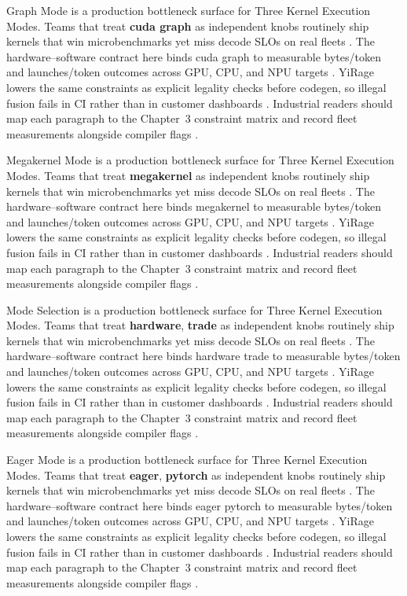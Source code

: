 Graph Mode is a production bottleneck surface for Three Kernel Execution Modes. Teams that treat \textbf{cuda graph} as independent knobs routinely ship kernels that win microbenchmarks yet miss decode SLOs on real fleets \citep{taxbreak2026,semianalysis2024tma}. The hardware--software contract here binds cuda graph to measurable bytes/token and launches/token outcomes across GPU, CPU, and NPU targets \citep{memoryfloor2026,amd2024xdna}. YiRage lowers the same constraints as explicit legality checks before codegen, so illegal fusion fails in CI rather than in customer dashboards \citep{nvidia2022hopper,amd2024aie}. Industrial readers should map each paragraph to the Chapter~3 constraint matrix and record fleet measurements alongside compiler flags \citep{semianalysis2024tma,dlbook}.

Megakernel Mode is a production bottleneck surface for Three Kernel Execution Modes. Teams that treat \textbf{megakernel} as independent knobs routinely ship kernels that win microbenchmarks yet miss decode SLOs on real fleets \citep{memoryfloor2026,amd2024xdna}. The hardware--software contract here binds megakernel to measurable bytes/token and launches/token outcomes across GPU, CPU, and NPU targets \citep{nvidia2022hopper,amd2024aie}. YiRage lowers the same constraints as explicit legality checks before codegen, so illegal fusion fails in CI rather than in customer dashboards \citep{semianalysis2024tma,dlbook}. Industrial readers should map each paragraph to the Chapter~3 constraint matrix and record fleet measurements alongside compiler flags \citep{amd2024xdna,dao2022flashattention}.

Mode Selection is a production bottleneck surface for Three Kernel Execution Modes. Teams that treat \textbf{hardware}, \textbf{trade} as independent knobs routinely ship kernels that win microbenchmarks yet miss decode SLOs on real fleets \citep{nvidia2022hopper,amd2024aie}. The hardware--software contract here binds hardware trade to measurable bytes/token and launches/token outcomes across GPU, CPU, and NPU targets \citep{semianalysis2024tma,dlbook}. YiRage lowers the same constraints as explicit legality checks before codegen, so illegal fusion fails in CI rather than in customer dashboards \citep{amd2024xdna,dao2022flashattention}. Industrial readers should map each paragraph to the Chapter~3 constraint matrix and record fleet measurements alongside compiler flags \citep{amd2024aie,kwon2023vllm}.

Eager Mode is a production bottleneck surface for Three Kernel Execution Modes. Teams that treat \textbf{eager}, \textbf{pytorch} as independent knobs routinely ship kernels that win microbenchmarks yet miss decode SLOs on real fleets \citep{semianalysis2024tma,dlbook}. The hardware--software contract here binds eager pytorch to measurable bytes/token and launches/token outcomes across GPU, CPU, and NPU targets \citep{amd2024xdna,dao2022flashattention}. YiRage lowers the same constraints as explicit legality checks before codegen, so illegal fusion fails in CI rather than in customer dashboards \citep{amd2024aie,kwon2023vllm}. Industrial readers should map each paragraph to the Chapter~3 constraint matrix and record fleet measurements alongside compiler flags \citep{dlbook,nvidia2024cudagraphs}.

